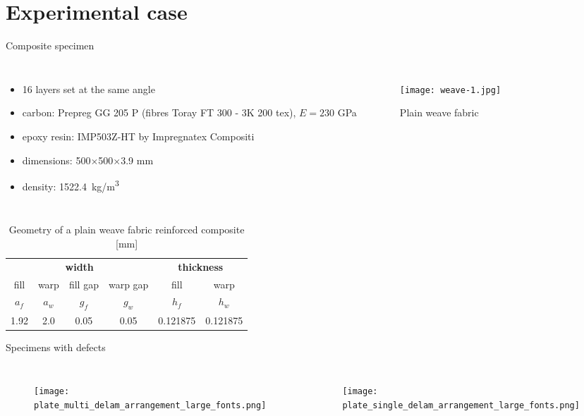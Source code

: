 \documentclass[10pt,aspectratio=169,dvipsnames]{beamer} %
\newcounter{angle}
\begin{document}
		\section{Experimental case}
		\begin{frame}[t]{Composite specimen}
			\begin{columns}[T]
				{\small
					\begin{itemize}
						\item 16 layers set at the same angle \\
						\item carbon: Prepreg GG 205  P (fibres Toray FT 300 - 3K 200 tex), $E=230$ GPa
						\item epoxy resin: IMP503Z-HT by Impregnatex Compositi 
						\item dimensions: 500$\times$500$\times$3.9 mm\\
						\item density: 1522.4~kg/m\textsuperscript{3}
					\end{itemize}
				}
				\begin{figure}
					\texttt{[image: weave-1.jpg]}
					\caption{Plain weave fabric}
				\end{figure}
			\end{columns}
			\begin{table}[h]
				\renewcommand{\arraystretch}{1.1}
				\centering \footnotesize
				\caption{Geometry of a plain weave fabric reinforced composite [mm]}
				\begin{tabular}{cccccc} 
					\toprule
					\multicolumn{4}{c}{\textbf{width} }	& \multicolumn{2}{c}{\textbf{thickness} }  \\ 
					\cmidrule(lr){1-4} \cmidrule(lr){5-6} 
					fill & warp & fill gap& warp gap& fill & warp\\
					$a_f$ &$a_w$& $g_f$  & $g_w$  & $h_f$& $h_w$ \\ 
					\cmidrule(lr){1-2} \cmidrule(lr){3-4} \cmidrule(lr){5-6}
					1.92 &2.0& 0.05& 0.05 & 0.121875 & 0.121875 \\
					\bottomrule 
				\end{tabular} 
				\label{tab:weave_geo}
			\end{table}
		\end{frame}
		\begin{frame}[t]{Specimens with defects}
			\vspace{-0.5cm}
			\begin{columns}[T]
				\begin{figure}
					\texttt{[image: plate\_multi\_delam\_arrangement\_large\_fonts.png]}
				\end{figure}
				\begin{figure}
					\texttt{[image: plate\_single\_delam\_arrangement\_large\_fonts.png]}
				\end{figure}
			\end{columns}
		\end{frame}
\end{document}
